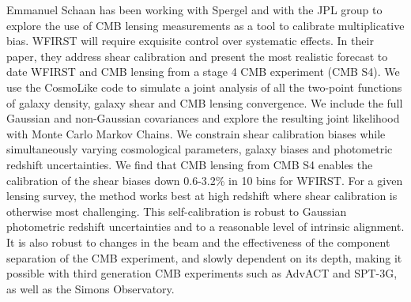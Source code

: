 Emmanuel Schaan has been working with Spergel and with the JPL group to
explore the use of CMB  lensing measurements as a tool to calibrate
multiplicative bias.  WFIRST  will require exquisite control over systematic
effects. In their paper, they address shear calibration and present the most
realistic forecast to date WFIRST and CMB lensing from a stage 4 CMB experiment
(CMB S4). We use the CosmoLike code to simulate a joint analysis of all the
two-point functions of galaxy density, galaxy shear and CMB lensing convergence.
We include the full Gaussian and non-Gaussian covariances and explore the
resulting joint likelihood with Monte Carlo Markov Chains. We constrain shear
calibration biases while simultaneously varying cosmological parameters, galaxy
biases and photometric redshift uncertainties. We find that CMB lensing from CMB
S4 enables the calibration of the shear biases down 0.6-3.2\% in 10 bins for
WFIRST. For a given lensing survey, the method works best at high redshift where
shear calibration is otherwise most challenging. This self-calibration is robust
to Gaussian photometric redshift uncertainties and to a reasonable level of
intrinsic alignment. It is also robust to changes in the beam and the
effectiveness of the component separation of the CMB experiment, and slowly
dependent on its depth, making it possible with third generation CMB experiments
such as AdvACT and SPT-3G, as well as the Simons Observatory.
